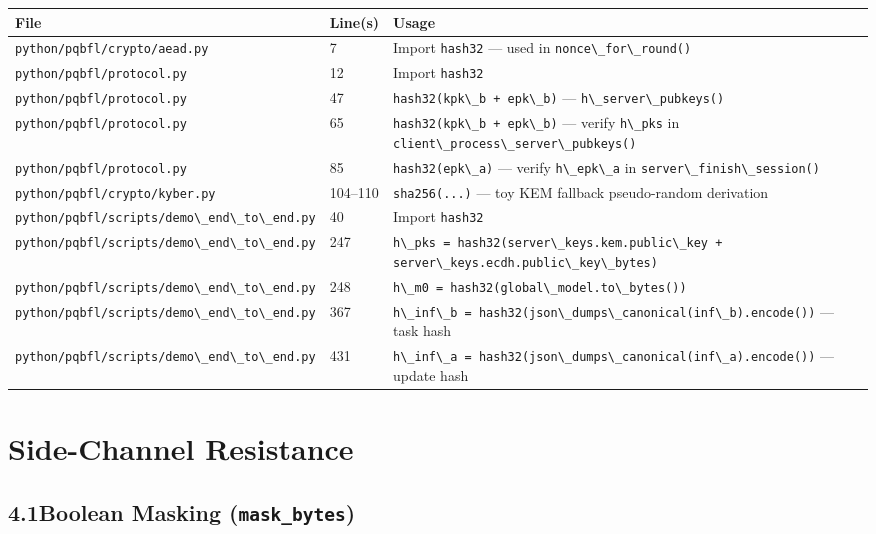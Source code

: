 \documentclass[11pt,a4paper]{article}
\newcommand{\code}[1]{\lstinline[basicstyle=\ttfamily\small]!#1!}
\begin{document}
\begin{longtable}{L{5.5cm} L{1.8cm} L{7cm}}
\toprule
\textbf{File} & \textbf{Line(s)} & \textbf{Usage} \\
\midrule
\endhead
\bottomrule
\endfoot
\code{python/pqbfl/crypto/aead.py}           & 7       & Import \code{hash32} --- used in \code{nonce\_for\_round()} \\
\code{python/pqbfl/protocol.py}              & 12      & Import \code{hash32} \\
\code{python/pqbfl/protocol.py}              & 47      & \code{hash32(kpk\_b + epk\_b)} --- \code{h\_server\_pubkeys()} \\
\code{python/pqbfl/protocol.py}              & 65      & \code{hash32(kpk\_b + epk\_b)} --- verify \code{h\_pks} in \code{client\_process\_server\_pubkeys()} \\
\code{python/pqbfl/protocol.py}              & 85      & \code{hash32(epk\_a)} --- verify \code{h\_epk\_a} in \code{server\_finish\_session()} \\
\code{python/pqbfl/crypto/kyber.py}          & 104--110 & \code{sha256(...)} --- toy KEM fallback pseudo-random derivation \\
\code{python/pqbfl/scripts/demo\_end\_to\_end.py} & 40      & Import \code{hash32} \\
\code{python/pqbfl/scripts/demo\_end\_to\_end.py} & 247     & \code{h\_pks = hash32(server\_keys.kem.public\_key + server\_keys.ecdh.public\_key\_bytes)} \\
\code{python/pqbfl/scripts/demo\_end\_to\_end.py} & 248     & \code{h\_m0 = hash32(global\_model.to\_bytes())} \\
\code{python/pqbfl/scripts/demo\_end\_to\_end.py} & 367     & \code{h\_inf\_b = hash32(json\_dumps\_canonical(inf\_b).encode())} --- task hash \\
\code{python/pqbfl/scripts/demo\_end\_to\_end.py} & 431     & \code{h\_inf\_a = hash32(json\_dumps\_canonical(inf\_a).encode())} --- update hash \\
\end{longtable}

\section{Side-Channel Resistance}

\subsection{4.1\quad Boolean Masking (\texttt{mask\_bytes})}
\end{document}

